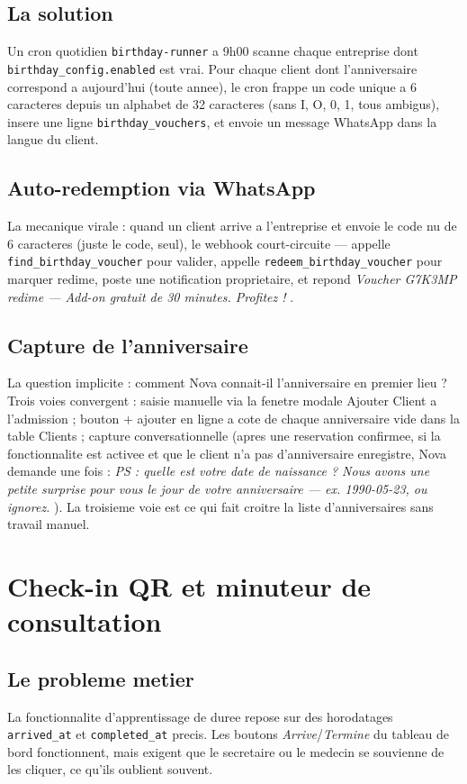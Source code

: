 \subsection{La solution}
Un cron quotidien \texttt{birthday-runner} a 9h00 scanne chaque
entreprise dont \texttt{birthday\_config.enabled} est vrai. Pour
chaque client dont l'anniversaire correspond a aujourd'hui (toute
annee), le cron frappe un code unique a 6 caracteres depuis un
alphabet de 32 caracteres (sans I, O, 0, 1, tous ambigus), insere une
ligne \texttt{birthday\_vouchers}, et envoie un message WhatsApp dans
la langue du client.

\subsection{Auto-redemption via WhatsApp}
La mecanique virale : quand un client arrive a l'entreprise et envoie
le code nu de 6 caracteres (juste le code, seul), le webhook
court-circuite --- appelle \texttt{find\_birthday\_voucher} pour
valider, appelle \texttt{redeem\_birthday\_voucher} pour marquer
redime, poste une notification proprietaire, et repond
\emph{\og Voucher G7K3MP redime --- Add-on gratuit de 30 minutes.
Profitez ! \fg{}}.

\subsection{Capture de l'anniversaire}
La question implicite : comment Nova connait-il l'anniversaire en
premier lieu ? Trois voies convergent : saisie manuelle via la fenetre
modale Ajouter Client a l'admission ; bouton \og + ajouter \fg{} en
ligne a cote de chaque anniversaire vide dans la table Clients ;
capture conversationnelle (apres une reservation confirmee, si la
fonctionnalite est activee et que le client n'a pas d'anniversaire
enregistre, Nova demande une fois : \emph{\og PS : quelle est votre
date de naissance ? Nous avons une petite surprise pour vous le jour
de votre anniversaire --- ex. 1990-05-23, ou ignorez. \fg{}}). La
troisieme voie est ce qui fait croitre la liste d'anniversaires sans
travail manuel.

\section{Check-in QR et minuteur de consultation}

\subsection{Le probleme metier}
La fonctionnalite d'apprentissage de duree repose sur des horodatages
\texttt{arrived\_at} et \texttt{completed\_at} precis. Les boutons
\emph{Arrive}/\emph{Termine} du tableau de bord fonctionnent, mais
exigent que le secretaire ou le medecin se souvienne de les cliquer,
ce qu'ils oublient souvent.

